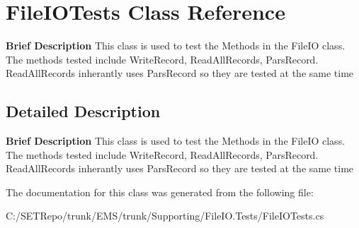 \hypertarget{class_file_i_o_tests}{}\section{File\+I\+O\+Tests Class Reference}
\label{class_file_i_o_tests}


{\bfseries  Brief Description} This class is used to test the Methods in the File\+I\+O class. The methods tested include Write\+Record, Read\+All\+Records, Pars\+Record. Read\+All\+Records inherantly uses Pars\+Record so they are tested at the same time  




\subsection{Detailed Description}
{\bfseries  Brief Description} This class is used to test the Methods in the File\+I\+O class. The methods tested include Write\+Record, Read\+All\+Records, Pars\+Record. Read\+All\+Records inherantly uses Pars\+Record so they are tested at the same time 

The documentation for this class was generated from the following file\+:\begin{DoxyCompactItemize}
\item 
C\+:/\+S\+E\+T\+Repo/trunk/\+E\+M\+S/trunk/\+Supporting/\+File\+I\+O.\+Tests/File\+I\+O\+Tests.\+cs\end{DoxyCompactItemize}
